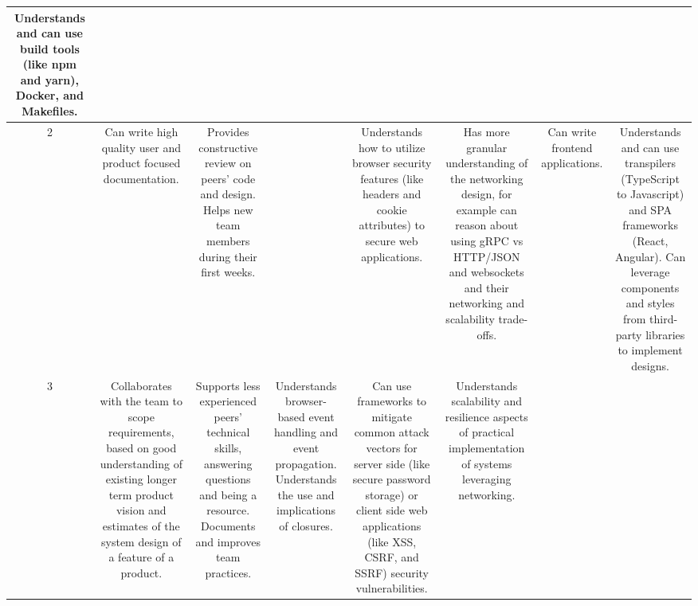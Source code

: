 \documentclass{article}
\begin{document}
{\begin{center}
\begin{tabular}{|C|C|C|C|C|C|C|C|}
    Understands and can use build tools (like npm and yarn), Docker, and
    Makefiles.
    \\ [13em]
  \hline
    2
    &

    Can write high quality user and product focused documentation.
    &

    Provides constructive review on peers' code and design. Helps new team
    members during their first weeks.
    &

    &

    Understands how to utilize browser security features (like headers and
    cookie attributes) to secure web applications.
    &

    Has more granular understanding of the networking design, for example can
    reason about using gRPC vs HTTP/JSON and websockets and their networking
    and scalability trade-offs.
    &

    Can write frontend applications.
    &

    Understands and can use transpilers (TypeScript to Javascript) and SPA
    frameworks (React, Angular). Can leverage components and styles from
    third-party libraries to implement designs.
    \\ [13em]
  \hline
    3
    &

    Collaborates with the team to scope requirements, based on good
    understanding of existing longer term product vision and estimates of the
    system design of a feature of a product.
    &

    Supports less experienced peers' technical skills, answering questions and
    being a resource. Documents and improves team practices.
    &

    Understands browser-based event handling and event propagation.
    Understands the use and implications of closures.
    &

    Can use frameworks to mitigate common attack vectors for server side (like
    secure password storage) or client side web applications (like XSS, CSRF, and
    SSRF) security vulnerabilities.
    &

    Understands scalability and resilience aspects of practical implementation
    of systems leveraging networking.


\end{tabular}
\end{center}}
\end{document}
